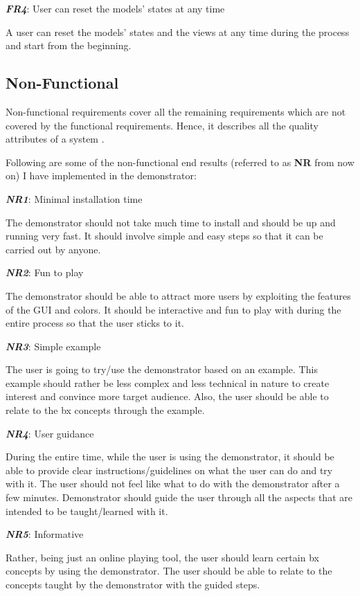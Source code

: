 \textbf{\textit{FR4}}: User can reset the models' states at any time

A user can reset the models' states and the views at any time during the process and start from the beginning.

\subsection{Non-Functional}\label{subsec:nonfunctionalreq}
Non-functional requirements cover all the remaining requirements which are not covered by the functional requirements. Hence, it describes all the quality attributes of a system \cite{funcandnonfuncreq}.

Following are some of the non-functional end results (referred to as \textbf{NR} from now on) I have implemented in the demonstrator:

\textbf{\textit{NR1}}: Minimal installation time

The demonstrator should not take much time to install and should be up and running very fast. It should involve simple and easy steps so that it can be carried out by anyone.

\textbf{\textit{NR2}}: Fun to play

The demonstrator should be able to attract more users by exploiting the features of the GUI and colors. It should be interactive and fun to play with during the entire process so that the user sticks to it.

\textbf{\textit{NR3}}: Simple example

The user is going to try/use the demonstrator based on an example. This example should rather be less complex and less technical in nature to create interest and convince more target audience. Also, the user should be able to relate to the bx concepts through the example.

\textbf{\textit{NR4}}: User guidance

During the entire time, while the user is using the demonstrator, it should be able to provide clear instructions/guidelines on what the user can do and try with it. The user should not feel like what to do with the demonstrator after a few minutes. Demonstrator should guide the user through all the aspects that are intended to be taught/learned with it.

\textbf{\textit{NR5}}: Informative

Rather, being just an online playing tool, the user should learn certain bx concepts by using the demonstrator. The user should be able to relate to the concepts taught by the demonstrator with the guided steps.

